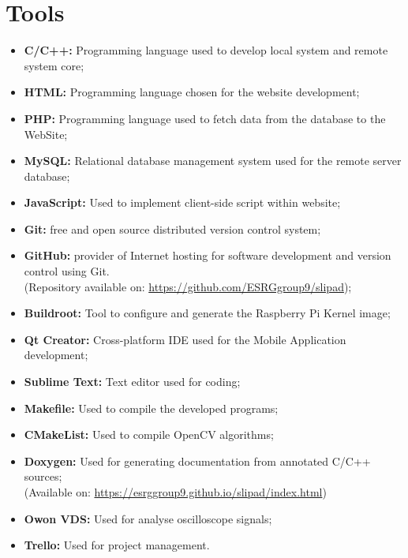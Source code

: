 \clearpage
\section{Tools}

\begin{itemize}
	\item \textbf{C/C++:} Programming language used to develop local system and remote system core;
	\item \textbf{HTML:} Programming language chosen for the website development;
	\item \textbf{PHP:} Programming language used to fetch data from the database to the WebSite;
	\item \textbf{MySQL:} Relational database management system used for the remote server database;
	\item \textbf{JavaScript:} Used to implement client-side script within website;
	\item \textbf{Git:} free and open source distributed version control system;
	\item \textbf{GitHub:} provider of Internet hosting for software development and version control using Git. \\ (Repository available on: \url{https://github.com/ESRGgroup9/slipad});
	\item \textbf{Buildroot:} Tool to configure and generate the Raspberry Pi Kernel image;
	
	\item \textbf{Qt Creator:} Cross-platform IDE used for the Mobile Application development;
	\item \textbf{Sublime Text:} Text editor used for coding;
			
	\item \textbf{Makefile:} Used to compile the developed programs;
	\item \textbf{CMakeList:} Used to compile OpenCV algorithms;

	\item \textbf{Doxygen:} Used for generating documentation from annotated C/C++ sources; \\ (Available on: \url{https://esrggroup9.github.io/slipad/index.html})
	\item \textbf{Owon VDS:} Used for analyse oscilloscope signals;
	
	\item \textbf{Trello:} Used for project management.
\end{itemize}

